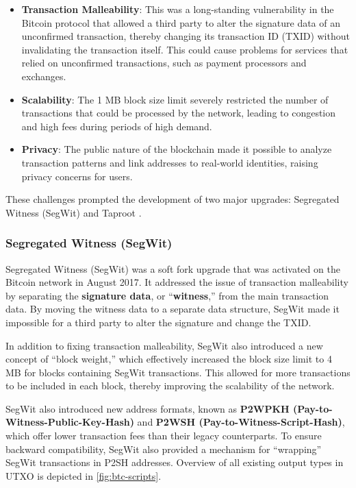 \begin{itemize}
	\tightlist
	\item
	\textbf{Transaction Malleability}: This was a long-standing
	vulnerability in the Bitcoin protocol that allowed a third party to
	alter the signature data of an unconfirmed transaction, thereby
	changing its transaction ID (TXID) without invalidating the
	transaction itself. This could cause problems for services that relied
	on unconfirmed transactions, such as payment processors and exchanges. 
	\item
	\textbf{Scalability}: The 1 MB block size limit severely restricted
	the number of transactions that could be processed by the network,
	leading to congestion and high fees during periods of high demand.
	\item
	\textbf{Privacy}: The public nature of the blockchain made it possible
	to analyze transaction patterns and link addresses to real-world
	identities, raising privacy concerns for users.
\end{itemize}
These challenges prompted the
development of two major upgrades: Segregated Witness (SegWit) and
Taproot . 

\subsubsection{Segregated Witness
	(SegWit)}\label{segregated-witness-segwit}

Segregated Witness (SegWit) was a soft fork upgrade that was activated
on the Bitcoin network in August 2017. It addressed the issue of
transaction malleability by separating the \textbf{signature data}, or
``\textbf{witness},'' from the main transaction data. By moving the witness data to a separate data structure, SegWit made it impossible for a third
party to alter the signature and change the TXID.

In addition to fixing transaction malleability, SegWit also introduced a
new concept of ``block weight,'' which effectively increased the block
size limit to 4 MB for blocks containing SegWit transactions. This
allowed for more transactions to be included in each block, thereby
improving the scalability of the network.

SegWit also introduced new address formats, known as \textbf{P2WPKH
(Pay-to-Witness-Public-Key-Hash)} and \textbf{P2WSH (Pay-to-Witness-Script-Hash)},
which offer lower transaction fees than their legacy counterparts. To
ensure backward compatibility, SegWit also provided a mechanism for
``wrapping'' SegWit transactions in P2SH addresses.
Overview of all existing output types in UTXO is depicted in \autoref{fig:btc-scripts}.


